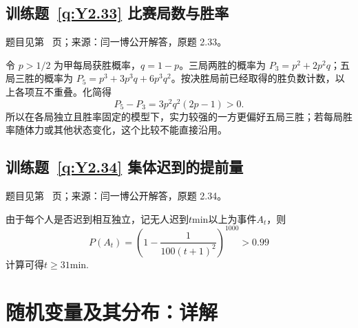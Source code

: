 \subsection*{训练题~\ref{q:Y2.33} 比赛局数与胜率}\label{a:Y2.33}{\small 题目见第~\pageref{q:Y2.33} 页；来源：闫一博公开解答，原题 2.33。}
\begin{solve}令 $p>1/2$ 为甲每局获胜概率，$q=1-p$。三局两胜的概率为 $P_3=p^2+2p^2q$；五局三胜的概率为 $P_5=p^3+3p^3q+6p^3q^2$。按决胜局前已经取得的胜负数计数，以上各项互不重叠。化简得\[P_5-P_3=3p^2q^2(2p-1)>0.\]所以在各局独立且胜率固定的模型下，实力较强的一方更偏好五局三胜；若每局胜率随体力或其他状态变化，这个比较不能直接沿用。\end{solve}

\subsection*{训练题~\ref{q:Y2.34} 集体迟到的提前量}\label{a:Y2.34}{\small 题目见第~\pageref{q:Y2.34} 页；来源：闫一博公开解答，原题 2.34。}
\begin{solve}
由于每个人是否迟到相互独立，记无人迟到$t$min以上为事件$A_t$，则
\[P({A_t}) = {(1 - \frac{1}{{100{{(t + 1)}^2}}})^{1000}} > 0.99\]
计算可得$t\geqslant 31$min.
\end{solve}

\clearpage\section*{随机变量及其分布：详解}

